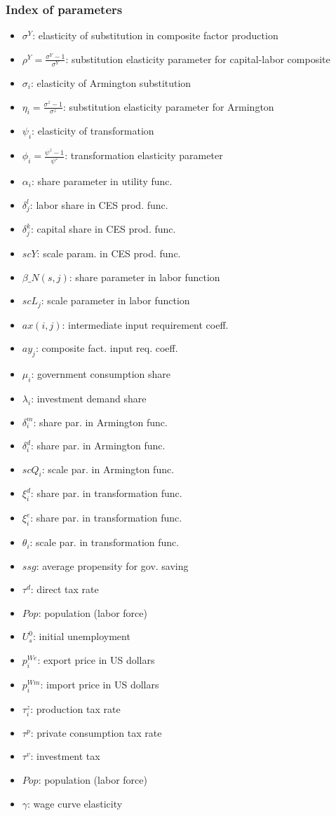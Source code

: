 \subsubsection{Index of parameters}
\begin{itemize}
	\item $\sigma^Y$: elasticity of substitution in composite factor production
	\item $\rho^Y = \frac{\sigma^Y - 1}{\sigma^Y}$: substitution elasticity parameter for capital-labor composite
	\item $\sigma_i$: elasticity of Armington substitution
	\item $\eta_i = \frac{\sigma^z - 1}{\sigma^z}$: substitution elasticity parameter for Armington
	\item $\psi_i$: elasticity of transformation
	\item $\phi_i= \frac{\psi^z - 1}{\psi^z}$: transformation elasticity parameter
	\item $\alpha_i$: share parameter in utility func.
	\item $\delta^l_j$: labor share   in CES prod. func.
	\item $\delta^k_j$: capital share in CES prod. func.
	\item $scY$: scale param.  in CES prod. func.
	\item $\beta\_N(s,j)$: share parameter in labor function
	\item $scL_j$: scale parameter in labor function
	\item $ax(i,j)$: intermediate input requirement coeff.
	\item $ay_j$:  composite fact. input req. coeff.
	\item $\mu_i$:  government consumption share
	\item $\lambda_i$: investment demand share
	\item $\delta^m_i$: share par. in Armington func.
	\item $\delta^d_i$: share par. in Armington func.
	\item $scQ_i$: scale par. in Armington func.
	\item $\xi^d_i$: share par. in transformation func.
	\item $\xi^e_i$: share par. in transformation func.
	\item $\theta_i$: scale par. in transformation func.
	\item $ssg$: average propensity for gov. saving
	\item $\tau^d$: direct tax rate
	\item $Pop$: population (labor force)
	\item $U^0_s$: initial unemployment
	\item $p^{We}_i$: export price in US dollars
	\item $p^{Wm}_i$: import price in US dollars
	\item $\tau^z_i$: production tax rate
	\item $\tau^p$: private consumption tax rate
	\item $\tau^v$: investment tax
	\item $Pop$: population (labor force)
	\item $\gamma$: wage curve elasticity
\end{itemize}
